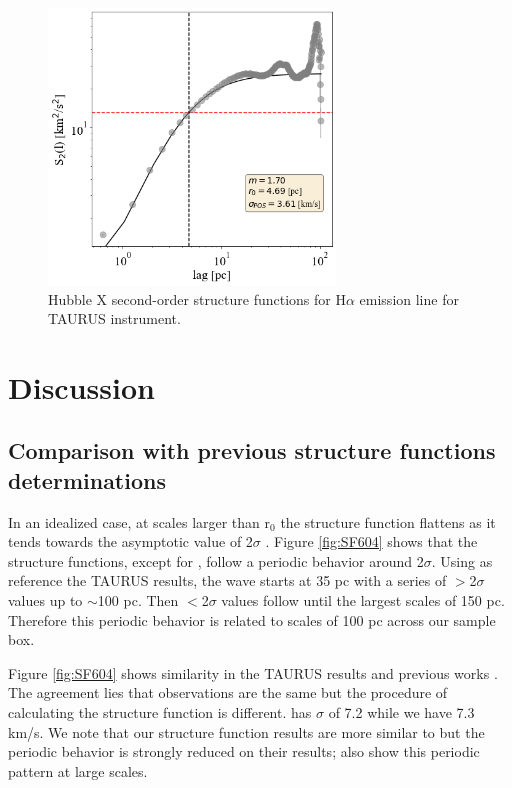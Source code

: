 \documentclass[fleqn,usenatbib]{mnras}
\begin{document}
\begin{figure}
\centering 
\includegraphics[width=3in]{Figures/HX}
\caption{Hubble X second-order structure functions for H$\alpha$ emission line for TAURUS instrument.}
\label{fig:SFX}
\end{figure}

\clearpage


\section{Discussion}\label{sec:disc}

\subsection{Comparison with previous structure functions determinations}

In an idealized case, at scales larger than r$_{0}$ the structure function flattens as it tends towards the asymptotic value of 2$\sigma$ \citep{arthur2016turbulence}. Figure \ref{fig:SF604} shows that the structure functions, except for \cite{2019arXiv191203543M}, follow a periodic behavior around 2$\sigma$. Using as reference the TAURUS results, the wave starts at 35 pc with a series of $ >$2$\sigma$ values up to $\sim$100 pc. Then $<$2$\sigma$ values follow until the largest scales of 150 pc. Therefore this periodic behavior is related to scales of 100 pc across our sample box.

Figure \ref{fig:SF604} shows similarity in the TAURUS results and previous works \citep{tanco1997,2019arXiv191203543M}. The agreement lies that observations are the same but the procedure of calculating the structure function is different. \citep{2019arXiv191203543M} has $\sigma$ of 7.2 while we have 7.3 km/s. We note that our structure function results are more similar to \cite{2019arXiv191203543M} but the periodic behavior is strongly reduced on their results; \citep{tanco1997} also show this periodic pattern at large scales.
\end{document}
